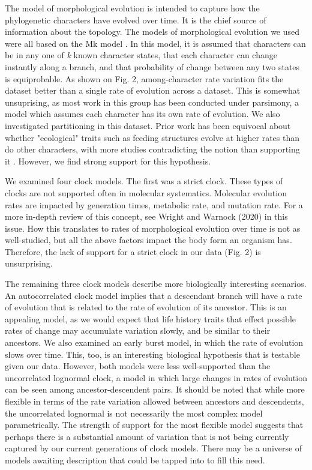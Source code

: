 \documentclass{article}
\begin{document}
The model of morphological evolution is intended to capture how the phylogenetic characters have evolved over time.
It is the chief source of information about the topology.
The models of morphological evolution we used were all based on the Mk model \citep{Lewis2001}. 
In this model, it is assumed that characters can be in any one of \textit{k} known character states, that each character can change instantly along a branch, and that probability of change between any two states is equiprobable.
As shown on Fig. 2, among-character rate variation fits the dataset better than a single rate of evolution across a dataset.
This is somewhat unsuprising, as most work in this group has been conducted under parsimony, a model which assumes each character has its own rate of evolution.
We also investigated partitioning in this dataset.
Prior work has been equivocal about whether "ecological" traits such as feeding structures evolve at higher rates than do other characters, with more studies contradicting the notion \citep{Foote1994,Sanchez-Villagra1998,Ciampaglio2002} than supporting it \citep{Wagner1995,Blomberg2003}.
However, we find strong support for this hypothesis.

We examined four clock models.
The first was a strict clock. 
These types of clocks are not supported often in molecular systematics.
Molecular evolution rates are impacted by generation times,  metabolic rate, and mutation rate.
For a more in-depth review of this concept, see Wright and Warnock (2020) in this issue.
How this translates to rates of morphological evolution over time is not as well-studied, but all the above factors impact the body form an organism has.
Therefore, the lack of support for a strict clock in our data (Fig. 2) is unsurprising.

The remaining three clock models describe more biologically interesting scenarios.
An autocorrelated clock model implies that a descendant branch will have a rate of evolution that is related to the rate of evolution of its ancestor.
This is an appealing model, as we would expect that life history traits that effect possible rates of change may accumulate variation slowly, and be similar to their ancestors. 
We also examined an early burst model, in which the rate of evolution slows over time.
This, too, is an interesting biological hypothesis that is testable given our data.
However, both models were less well-supported than the uncorrelated lognormal clock,
a model in which large changes in rates of evolution can be seen among ancestor-descendent pairs.
It should be noted that while more flexible in terms of the rate variation allowed between ancestors and descendents, the uncorrelated lognormal is not necessarily the most complex model parametrically. 
The strength of support for the most flexible model suggests that perhaps there is a substantial amount of variation that is not being currently captured by our current generations of clock models.
There may be a universe of models awaiting description that could be tapped into to fill this need.
\end{document}
